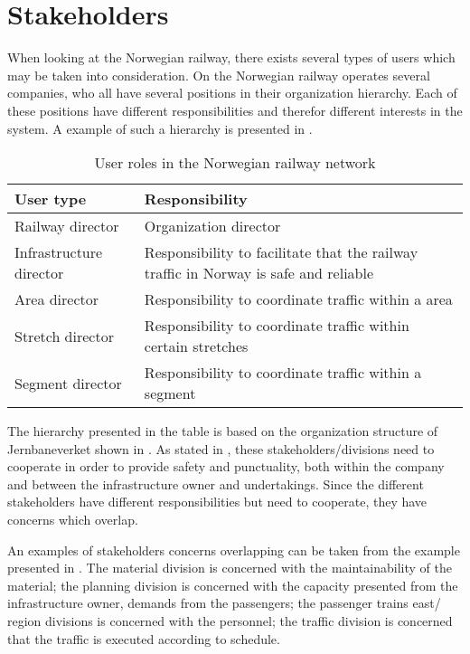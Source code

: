 
\section{Stakeholders} %
\label{sec:back_stakeholders}
When looking at the Norwegian railway, there exists several types of users which
may be taken into consideration. On the Norwegian railway operates several
companies, who all have several positions in their organization hierarchy. Each
of these positions have different responsibilities and therefor different
interests in the system. A example of such a hierarchy is presented in
.

\begin{table}[!h]\small
	\begin{tabularx}{\textwidth}{|l|X|}
		\hline
		User type & Responsibility \\
		\hline
		Railway director & Organization director\\
		\hline
		Infrastructure director & Responsibility to facilitate that the railway traffic in Norway is safe and reliable\\
		\hline
		Area director & Responsibility to coordinate traffic within a area\\
		\hline
		Stretch director & Responsibility to coordinate traffic within certain
		stretches\\
		\hline
		Segment director & Responsibility to coordinate traffic within a segment\\
		\hline
	\end{tabularx}
\caption{User roles in the Norwegian railway network}
\label{table:user_roles}
\end{table}

The hierarchy presented in the table is based on the organization structure of
Jernbaneverket shown in . As stated in
, these stakeholders/divisions need to cooperate 
in order to provide safety and punctuality, both within the company and 
between the infrastructure owner and undertakings. Since the different 
stakeholders have different responsibilities but need to cooperate, they have 
concerns which overlap. 

An examples of stakeholders concerns overlapping can 
be taken from the example presented in . The 
material division is concerned with the maintainability of the material; the 
planning division is concerned with the capacity presented from the 
infrastructure owner, demands from the passengers; the passenger trains east/
region divisions is concerned with the personnel; the traffic division is
concerned that the traffic is executed according to schedule. 

